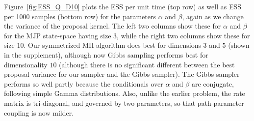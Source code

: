 Figure~\ref{fig:ESS_Q_D10} plots the ESS per unit time (top row) as well as ESS per 1000 samples (bottom row) for the parameters $\alpha$ and $\beta$, again as we change the variance of the proposal kernel. 
The left two columns show these for $\alpha$ and $\beta$ for the MJP state-space having size $3$, while the right two columns show these for size $10$.
Our symmetrized  MH algorithm does best for dimensions $3$ and $5$ (shown in the supplement), although now Gibbs sampling performs best for dimensionality $10$ (although there is no significant different between the best proposal variance for our sampler and the Gibbs sampler).
The Gibbs sampler performs so well partly because the conditionals over $\alpha$ and $\beta$ are conjugate, following simple Gamma distributions. Also, unlike the earlier problem, the rate matrix is tri-diagonal, and governed by two parameters, so that path-parameter coupling is now milder.
